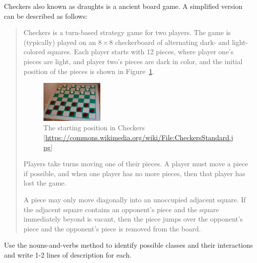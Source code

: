 Checkers also known as draughts is a ancient board game. A simplified
version can be described as follows:
\begin{quote}
  Checkers is a turn-based strategy game for two players. The game is
  (typically) played on an $8\times8$ checkerboard of alternating
  dark- and light-colored squares. Each player starts with 12 pieces, where
  player one's pieces are light, and player two's pieces are dark in
  color, and the initial position of the pieces is shown in
  Figure~\ref{fig:checkers}.
  \begin{figure}
    \centering
    \includegraphics[width=0.3\textwidth]{800px-CheckersStandard}
    \caption{The starting position in Checkers [\url{https://commons.wikimedia.org/wiki/File:CheckersStandard.jpg}]}
    \label{fig:checkers}
  \end{figure}
  Players take turns moving one of their pieces. A player must move a
  piece if possible, and when one player has no more pieces, then that
  player has lost the game.

  A piece may only move diagonally into an unoccupied adjacent
  square. If the adjacent square contains an opponent's piece and the
  square immediately beyond is vacant, then the piece jumps over the
  opponent's piece and the opponent's piece is removed from the
  board.
\end{quote}
Use the nouns-and-verbs method to identify possible classes and their
interactions and write 1-2 lines of description for each.